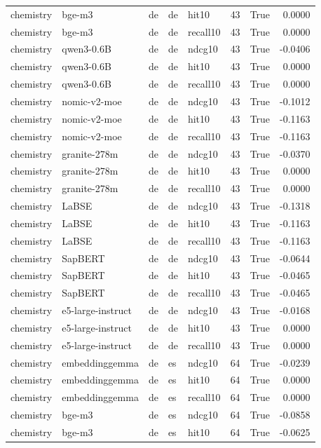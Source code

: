 \begin{tabular}{lllllrrr}
chemistry & bge-m3 & de & de & hit10 & 43 & True & 0.0000 \\
chemistry & bge-m3 & de & de & recall10 & 43 & True & 0.0000 \\
chemistry & qwen3-0.6B & de & de & ndcg10 & 43 & True & -0.0406 \\
chemistry & qwen3-0.6B & de & de & hit10 & 43 & True & 0.0000 \\
chemistry & qwen3-0.6B & de & de & recall10 & 43 & True & 0.0000 \\
chemistry & nomic-v2-moe & de & de & ndcg10 & 43 & True & -0.1012 \\
chemistry & nomic-v2-moe & de & de & hit10 & 43 & True & -0.1163 \\
chemistry & nomic-v2-moe & de & de & recall10 & 43 & True & -0.1163 \\
chemistry & granite-278m & de & de & ndcg10 & 43 & True & -0.0370 \\
chemistry & granite-278m & de & de & hit10 & 43 & True & 0.0000 \\
chemistry & granite-278m & de & de & recall10 & 43 & True & 0.0000 \\
chemistry & LaBSE & de & de & ndcg10 & 43 & True & -0.1318 \\
chemistry & LaBSE & de & de & hit10 & 43 & True & -0.1163 \\
chemistry & LaBSE & de & de & recall10 & 43 & True & -0.1163 \\
chemistry & SapBERT & de & de & ndcg10 & 43 & True & -0.0644 \\
chemistry & SapBERT & de & de & hit10 & 43 & True & -0.0465 \\
chemistry & SapBERT & de & de & recall10 & 43 & True & -0.0465 \\
chemistry & e5-large-instruct & de & de & ndcg10 & 43 & True & -0.0168 \\
chemistry & e5-large-instruct & de & de & hit10 & 43 & True & 0.0000 \\
chemistry & e5-large-instruct & de & de & recall10 & 43 & True & 0.0000 \\
chemistry & embeddinggemma & de & es & ndcg10 & 64 & True & -0.0239 \\
chemistry & embeddinggemma & de & es & hit10 & 64 & True & 0.0000 \\
chemistry & embeddinggemma & de & es & recall10 & 64 & True & 0.0000 \\
chemistry & bge-m3 & de & es & ndcg10 & 64 & True & -0.0858 \\
chemistry & bge-m3 & de & es & hit10 & 64 & True & -0.0625 \\

\end{tabular}
